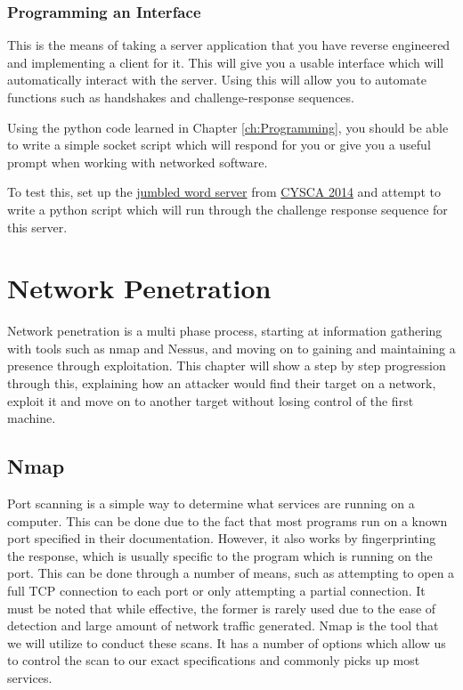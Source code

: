 \documentclass[a4paper,11pt]{report}
\begin{document}
		\subsection{Programming an Interface}
			This is the means of taking a server application that you have reverse engineered and implementing a client for it. 
			This will give you a usable interface which will automatically interact with the server. 
			Using this will allow you to automate functions such as handshakes and challenge-response sequences. 

			Using the python code learned in Chapter \ref{ch:Programming}, 
			you should be able to write a simple socket script which will respond for you or give you a useful prompt when working with networked software. 

			To test this, set up the \href{https://github.com/CySCA/CySCA2014/blob/master/misc-server/programming/prog01/server.py}{jumbled word server} from \href{https://cyberchallenge.com.au/}{CYSCA 2014} and attempt to write a python script which will run through the challenge response sequence for this server. 

\chapter{Network Penetration}
	\label{ch:NetworkPenetration}
	Network penetration is a multi phase process, starting at information gathering with tools such as nmap and Nessus, and moving on to gaining and maintaining a presence through exploitation. 
	This chapter will show a step by step progression through this, explaining how an attacker would find their target on a network, exploit it and move on to another target without losing control of the first machine. 
	\section{Nmap}
		Port scanning is a simple way to determine what services are running on a computer. 
		This can be done due to the fact that most programs run on a known port specified in their documentation. 
		However, it also works by fingerprinting the response, which is usually specific to the program which is running on the port. 
		This can be done through a number of means, such as attempting to open a full TCP connection to each port or only attempting a partial connection. 
		It must be noted that while effective, the former is rarely used due to the ease of detection and large amount of network traffic generated. 
		Nmap\cite{NmapBook} is the tool that we will utilize to conduct these scans. 
		It has a number of options which allow us to control the scan to our exact specifications and commonly picks up most services.\cite{HackingAOE} 
\end{document}
